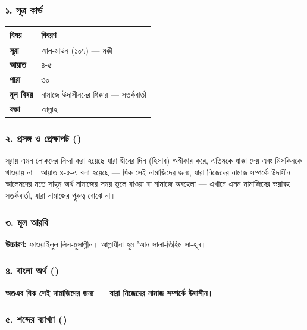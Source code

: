 \subsubsection*{১. সূত্র কার্ড}

\begin{table}[h]\centering\small
\begin{tabular}{ll}
বিষয় & বিবরণ \\
\hline
\textbf{সূরা} & আল-মাউন (১০৭) — মক্কী \\
\textbf{আয়াত} & ৪-৫ \\
\textbf{পারা} & ৩০ \\
\textbf{মূল বিষয়} & নামাজে উদাসীনদের ধিক্কার — সতর্কবার্তা \\
\textbf{বক্তা} & আল্লাহ \\
\hline
\end{tabular}
\end{table}

\subsubsection*{২. প্রসঙ্গ ও প্রেক্ষাপট ()}

সূরায় এমন লোকদের নিন্দা করা হয়েছে যারা দ্বীনের দিন (হিসাব) অস্বীকার করে, এতিমকে ধাক্কা দেয় এবং মিসকিনকে খাওয়ায় না। আয়াত ৪-৫-এ বলা হয়েছে — ধিক সেই নামাজিদের জন্য, যারা নিজেদের নামাজ সম্পর্কে উদাসীন। আলেমদের মতে সাহূন অর্থ নামাজের সময় ভুলে যাওয়া বা নামাজে অবহেলা — এখানে এমন নামাজিদের ভয়াবহ সতর্কবার্তা, যারা নামাজের গুরুত্ব বোঝে না।

\subsubsection*{৩. মূল আরবি}

\begin{center}\end{center}

\textbf{উচ্চারণ:} ফাওয়াইলুল লিল-মুসাল্লীন। আল্লাযীনা হুম 'আন সালা-তিহিম সা-হূন।

\subsubsection*{৪. বাংলা অর্থ ()}

\textbf{অতএব ধিক সেই নামাজিদের জন্য — যারা নিজেদের নামাজ সম্পর্কে উদাসীন।}

\subsubsection*{৫. শব্দের ব্যাখ্যা ()}


